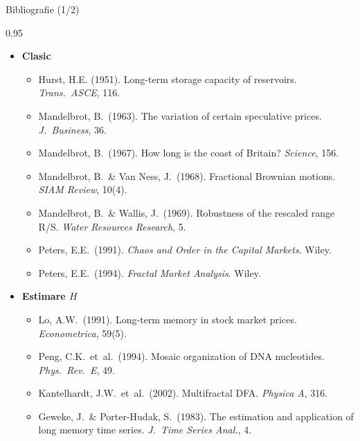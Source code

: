 \documentclass[9pt, aspectratio=169, t]{beamer}
\begin{document}
\begin{frame}[shrink=15]{Bibliografie (1/2)}
\begin{cminipage}{0.95\textwidth}
\begin{itemize}\setlength{\itemsep}{0pt}
    \item \textbf{Clasic}
    \begin{itemize}\setlength{\itemsep}{0pt}
        \item Hurst, H.E. (1951). Long-term storage capacity of reservoirs. \textit{Trans.\ ASCE}, 116.
        \item Mandelbrot, B.\ (1963). The variation of certain speculative prices. \textit{J.\ Business}, 36.
        \item Mandelbrot, B.\ (1967). How long is the coast of Britain? \textit{Science}, 156.
        \item Mandelbrot, B.\ \& Van Ness, J.\ (1968). Fractional Brownian motions. \textit{SIAM Review}, 10(4).
        \item Mandelbrot, B.\ \& Wallis, J.\ (1969). Robustness of the rescaled range R/S. \textit{Water Resources Research}, 5.
        \item Peters, E.E.\ (1991). \textit{Chaos and Order in the Capital Markets}. Wiley.
        \item Peters, E.E.\ (1994). \textit{Fractal Market Analysis}. Wiley.
    \end{itemize}
    \item \textbf{Estimare $H$}
    \begin{itemize}\setlength{\itemsep}{0pt}
        \item Lo, A.W.\ (1991). Long-term memory in stock market prices. \textit{Econometrica}, 59(5).
        \item Peng, C.K.\ et~al.\ (1994). Mosaic organization of DNA nucleotides. \textit{Phys.\ Rev.\ E}, 49.
        \item Kantelhardt, J.W.\ et~al.\ (2002). Multifractal DFA. \textit{Physica A}, 316.
        \item Geweke, J.\ \& Porter-Hudak, S.\ (1983). The estimation and application of long memory time series. \textit{J.\ Time Series Anal.}, 4.
    \end{itemize}
\end{itemize}
\end{cminipage}
\end{frame}
\end{document}
